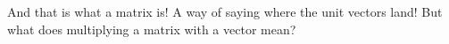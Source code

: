 \documentclass[preview]{standalone}
\begin{document}
\begin{minipage}
{8cm}And that is what a matrix is! A way of saying where the unit vectors land! But what does multiplying a matrix with a vector mean?
\end{minipage}
\end{document}
